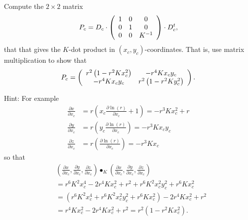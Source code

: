 \begin{exercise}
\label{32}Compute the $2\times2$ matrix%
\[
P_{c}=D_{c}\cdot\left(
\begin{array}
[c]{ccc}%
1 & 0 & 0\\
0 & 1 & 0\\
0 & 0 & K^{-1}%
\end{array}
\right)  \cdot D_{c}^{t},
\]
that that gives the $K$-dot product in $\left(  x_{c},y_{c}\right)
$-coordinates. That is, use matrix multiplication to show that%
\[
P_{c}=\left(
\begin{array}
[c]{cc}%
r^{2}\left(  1-r^{2}Kx_{c}^{2}\right)  & -r^{4}Kx_{c}y_{c}\\
-r^{4}Kx_{c}y_{c} & r^{2}\left(  1-r^{2}Ky_{c}^{2}\right)
\end{array}
\right)  .
\]


Hint: For example%
\begin{align*}
\frac{\partial x}{\partial x_{c}}  &  =r\left(  x_{c}\frac{\partial \ln\left(
r\right)  }{\partial x_{c}}+1\right)  =-r^{3}Kx_{c}^{2}+r\\
\frac{\partial y}{\partial x_{c}}  &  =r\left(  y_{c}\frac{\partial \ln\left(
r\right)  }{\partial x_{c}}\right)  =-r^{3}Kx_{c}y_{c}\\
\frac{\partial z}{\partial x_{c}}  &  =r\left(  \frac{\partial \ln\left(
r\right)  }{\partial x_{c}}\right)  =-r^{3}Kx_{c}%
\end{align*}
so that%
\begin{align*}
&  \left(  \frac{\partial x}{\partial x_{c}},\frac{\partial y}{\partial x_{c}%
},\frac{\partial z}{\partial x_{c}}\right)  \bullet_{K}\left(  \frac{\partial
x}{\partial x_{c}},\frac{\partial y}{\partial x_{c}},\frac{\partial
z}{\partial x_{c}}\right) \\
&  =r^{6}K^{2}x_{c}^{4}-2r^{4}Kx_{c}^{2}+r^{2}+r^{6}K^{2}x_{c}^{2}y_{c}%
^{2}+r^{6}Kx_{c}^{2}\\
&  =\left(  r^{6}K^{2}x_{c}^{4}+r^{6}K^{2}x_{c}^{2}y_{c}^{2}+r^{6}Kx_{c}%
^{2}\right)  -2r^{4}Kx_{c}^{2}+r^{2}\\
&  =r^{4}Kx_{c}^{2}-2r^{4}Kx_{c}^{2}+r^{2}=r^{2}\left(  1-r^{2}Kx_{c}%
^{2}\right)  .
\end{align*}

\end{exercise}

